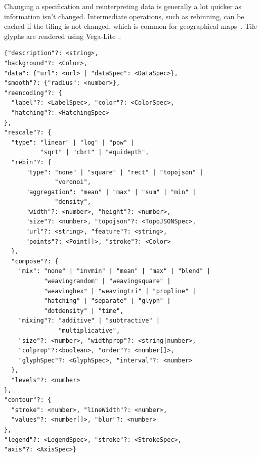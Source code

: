 Changing a specification and reinterpreting data is generally a lot quicker as information isn't changed. Intermediate operations, such as rebinning, can be cached if the tiling is not changed, which is common for geographical maps~\cite{jo2019declarative}.
Tile glyphs are rendered using Vega-Lite~\cite{satyanarayan2016vega}.

\begin{lstfloat}
	\small{
		\begin{lstlisting}[caption={Syntax of Class Buffer specifications. Different TypeScript notations show the required JSON fields for the model to interpret the data in the minimal way~\cite{jo2019declarative}. Fields denoted by questionmarks can be omitted.},captionpos=b,label=lis:specs]
{"description"?: <string>,
"background"?: <Color>,
"data": {"url": <url> | "dataSpec": <DataSpec>},
"smooth"?: {"radius": <number>},
"reencoding"?: {
  "label"?: <LabelSpec>, "color"?: <ColorSpec>,
  "hatching"?: <HatchingSpec>
},
"rescale"?: {
  "type": "linear" | "log" | "pow" | 
          "sqrt" | "cbrt" | "equidepth",
  "rebin"?: {
      "type": "none" | "square" | "rect" | "topojson" | 
              "voronoi",
      "aggregation": "mean" | "max" | "sum" | "min" | 
              "density",
      "width"?: <number>, "height"?: <number>,
      "size"?: <number>, "topojson"?: <TopoJSONSpec>,
      "url"?: <string>, "feature"?: <string>,
      "points"?: <Point[]>, "stroke"?: <Color>
  },
  "compose"?: {
    "mix": "none" | "invmin" | "mean" | "max" | "blend" | 
           "weavingrandom" | "weavingsquare" | 
           "weavinghex" | "weavingtri" | "propline" | 
           "hatching" | "separate" | "glyph" | 
           "dotdensity" | "time",
    "mixing"?: "additive" | "subtractive" | 
               "multiplicative",
    "size"?: <number>, "widthprop"?: <string|number>,
    "colprop"?:<boolean>, "order"?: <number[]>,
    "glyphSpec"?: <GlyphSpec>, "interval"?: <number>
  },
  "levels"?: <number>
},
"contour"?: {
  "stroke": <number>, "lineWidth"?: <number>,
  "values"?: <number[]>, "blur"?: <number>
},
"legend"?: <LegendSpec>, "stroke"?: <StrokeSpec>,
"axis"?: <AxisSpec>}
\end{lstlisting}
	}
\end{lstfloat}

